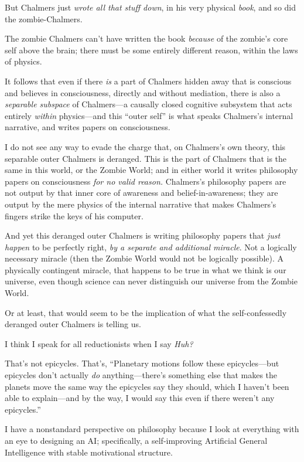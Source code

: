 {
 But Chalmers just \textit{wrote all that stuff down}, in his very
physical \textit{book}, and so did the zombie-Chalmers.}

{
 The zombie Chalmers can't have written the book
\textit{because} of the zombie's core self above the
brain; there must be some entirely different reason, within the laws of
physics.}

{
 It follows that even if there \textit{is} a part of Chalmers
hidden away that is conscious and believes in consciousness, directly
and without mediation, there is also a \textit{separable subspace} of
Chalmers---a causally closed cognitive subsystem that acts entirely
\textit{within} physics---and this ``outer
self'' is what speaks Chalmers's
internal narrative, and writes papers on consciousness.}

{
 I do not see any way to evade the charge that, on
Chalmers's own theory, this separable outer Chalmers is
deranged. This is the part of Chalmers that is the same in this world,
or the Zombie World; and in either world it writes philosophy papers on
consciousness \textit{for no valid reason.} Chalmers's
philosophy papers are not output by that inner core of awareness and
belief-in-awareness; they are output by the mere physics of the
internal narrative that makes Chalmers's fingers strike
the keys of his computer.}

{
 And yet this deranged outer Chalmers is writing philosophy papers
that \textit{just happen} to be perfectly right, \textit{by a separate
and additional miracle}. Not a logically necessary miracle (then the
Zombie World would not be logically possible). A physically contingent
miracle, that happens to be true in what we think is our universe, even
though science can never distinguish our universe from the Zombie
World.}

{
 Or at least, that would seem to be the implication of what the
self-confessedly deranged outer Chalmers is telling us.}

{
 I think I speak for all reductionists when I say \textit{Huh?}}

{
 That's not epicycles. That's,
``Planetary motions follow these epicycles---but
epicycles don't actually \textit{do}
anything---there's something else that makes the
planets move the same way the epicycles say they should, which I
haven't been able to explain---and by the way, I would
say this even if there weren't any
epicycles.''}

{
 I have a nonstandard perspective on philosophy because I look at
everything with an eye to designing an AI; specifically, a
self-improving Artificial General Intelligence with stable motivational
structure.}

